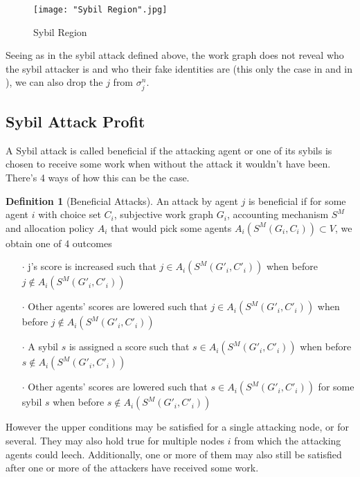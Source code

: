 \documentclass[11pt,a4paper]{report}
\theoremstyle{definition}
\newtheorem{definition}{Definition}[section]
\theoremstyle{theorem}
\theoremstyle{proposition}
\theoremstyle{corollary}
\theoremstyle{lemma}
\theoremstyle{example}
\theoremstyle{remark}
\begin{document}
\begin{figure}[H]
\begin{center}
\texttt{[image: "Sybil Region".jpg]}
\caption{Sybil Region}
\label{fig:Sybil Region}
\end{center}
\end{figure}

\noindent{}Seeing as in the sybil attack defined above, the work graph does not reveal who the sybil attacker is and who their fake identities are (this only the case in \cite{Sybil-resistant Trust Mechanisms in Distributed Systems} and in \cite{On the Sybil-Proofness of Accounting Mechanisms}), we can also drop the $j$ from $\sigma^n_j$. \vspace{1em}\\

\subsection{Sybil Attack Profit}
\label{subsec:Sybil Attack Profit}
\noindent A Sybil attack is called beneficial if the attacking agent or one of its sybils is chosen to receive some work when without the attack it wouldn't have been. There's 4 ways of how this can be the case. 

\begin{definition}[Beneficial Attacks]
An attack by agent $j$ is beneficial if for some agent $i$ with choice set $C_i$, subjective work graph $G_i$, accounting mechanism $S^M$ and allocation policy $A_i$ that would pick some agents $A_i(S^M(G_i,C_i))\subset{}V$, we obtain one of 4 outcomes 
\begin{itemize}
\item[$\cdot$] j's score is increased such that $j\in{}A_i(S^M(G'_i,C'_i))$ when before $j\not\in{}A_i(S^M(G'_i,C'_i))$
\item[$\cdot$] Other agents' scores are lowered such that $j\in{}A_i(S^M(G'_i,C'_i))$ when before $j\not\in{}A_i(S^M(G'_i,C'_i))$
\item[$\cdot$] A sybil $s$ is assigned a score such that $s\in{}A_i(S^M(G'_i,C'_i))$ when before $s\not\in{}A_i(S^M(G'_i,C'_i))$
\item[$\cdot$] Other agents' scores are lowered such that $s\in{}A_i(S^M(G'_i,C'_i))$ for some sybil $s$ when before $s\not\in{}A_i(S^M(G'_i,C'_i))$
\end{itemize}
\end{definition}
\noindent{}However the upper conditions may be satisfied for a single attacking node, or for several. They may also hold true for multiple nodes $i$ from which the attacking agents could leech. Additionally, one or more of them may also still be satisfied after one or more of the attackers have received some work. \vspace{1em}\\
\end{document}
